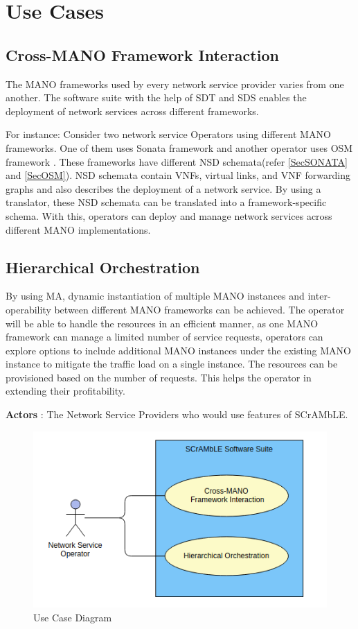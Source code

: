 \section{Use Cases}

\subsection{Cross-MANO Framework Interaction}
The MANO frameworks used by every network service provider varies from one another. The software suite with the help of SDT and SDS enables the deployment of network services across different frameworks.

For instance: Consider two network service Operators using different MANO frameworks. One of them uses Sonata framework \cite{draxler2017sonata} and another operator uses OSM framework \cite{ersue2013etsi}. These frameworks have different NSD schemata(refer \ref{SecSONATA} and \ref{SecOSM}). NSD schemata contain VNFs, virtual links, and VNF forwarding graphs and also describes the deployment of a network service. By using a translator, these NSD schemata can be translated into a framework-specific schema. With this, operators can deploy and manage network services across different MANO implementations.

\subsection{Hierarchical Orchestration}
By using MA, dynamic instantiation of multiple MANO instances and inter-operability between different MANO frameworks can be achieved. The operator will be able to handle the resources in an efficient manner, as one MANO framework can manage a limited number of service requests, operators can explore options to include additional MANO instances under the existing MANO instance to mitigate the traffic load on a single instance. The resources can be provisioned based on the number of requests. This helps the operator in extending their profitability.

\textbf{Actors} : The Network Service Providers who would use features of SCrAMbLE.

\begin{figure} [h]
	\centering
	\includegraphics[width=0.9\linewidth]{figures/use-case}
	\caption{Use Case Diagram}
	\label{fig:use-case}
\end{figure}





